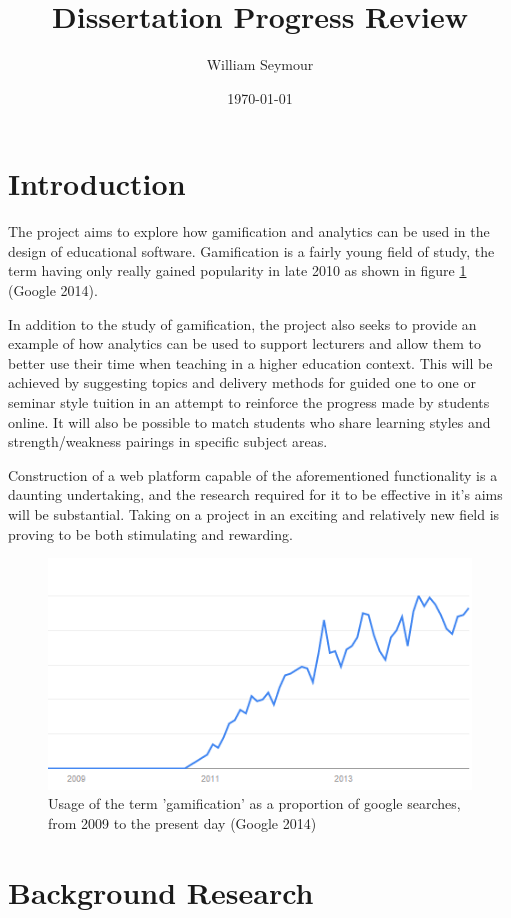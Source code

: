 \documentclass[10pt,a4paper]{report}
\author{William Seymour}
\title{Dissertation Progress Review}
\date{\today}
\begin{document}
\maketitle

\section*{Introduction}
The project aims to explore how gamification and analytics can be used in the design of educational software. Gamification is a fairly young field of study, the term having only really gained popularity in late 2010 as shown in figure \ref{usage} (Google 2014).

In addition to the study of gamification, the project also seeks to provide an example of how analytics can be used to support lecturers and allow them to better use their time when teaching in a higher education context. This will be achieved by suggesting topics and delivery methods for guided one to one or seminar style tuition in an attempt to reinforce the progress made by students online. It will also be possible to match students who share learning styles and strength/weakness pairings in specific subject areas.

Construction of a web platform capable of the aforementioned functionality is a daunting undertaking, and the research required for it to be effective in it's aims will be substantial. Taking on a project in an exciting and relatively new field is proving to be both stimulating and rewarding.
\begin{figure}
	\includegraphics{../img/usage-graph.png}
	\caption{Usage of the term 'gamification' as a proportion of google searches, from 2009 to the present day (Google 2014)}
	\label{usage}
\end{figure}
\section*{Background Research}
\end{document}
